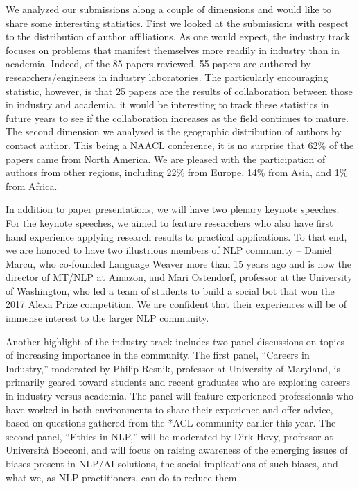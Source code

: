 We analyzed our submissions along a couple of dimensions and would like to share some interesting statistics. First we looked at the submissions with respect to the distribution of author affiliations. As one would expect, the industry track focuses on problems that manifest themselves more readily in industry than in academia. Indeed, of the 85 papers reviewed, 55 papers are authored by researchers/engineers in industry laboratories. The particularly encouraging statistic, however, is that 25 papers are the results of collaboration between those in industry and academia. it would be interesting to track these statistics in future years to see if the collaboration increases as the field continues to mature. The second dimension we analyzed is the geographic distribution of authors by contact author. This being a NAACL conference, it is no surprise that 62\% of the papers came from North America. We are pleased with the participation of authors from other regions, including 22\% from Europe, 14\% from Asia, and 1\% from Africa. 

In addition to paper presentations, we will have two plenary keynote speeches. For the keynote speeches, we aimed to feature researchers who also have first hand experience applying research results to practical applications. To that end, we are honored to have two illustrious members of NLP community --  Daniel Marcu, who co-founded Language Weaver more than 15 years ago and is now the director of MT/NLP at Amazon, and Mari Ostendorf, professor at the University of Washington, who led a team of students to build a social bot that won the 2017 Alexa Prize competition. We are confident that their experiences will be of immense interest to the larger NLP community.

Another highlight of the industry track includes two panel discussions on topics of increasing importance in the community. The first panel, ``Careers in Industry,'' moderated by Philip Resnik, professor at University of Maryland, is primarily geared toward students and recent graduates who are exploring careers in industry versus academia. The panel will feature experienced professionals who have worked in both environments to share their experience and offer advice, based on questions gathered from the *ACL community earlier this year. The second panel, ``Ethics in NLP,'' will be moderated by Dirk Hovy, professor at Università Bocconi, and will focus on raising awareness of the emerging issues of biases present in NLP/AI solutions, the social implications of such biases, and what we, as NLP practitioners, can do to reduce them. 

